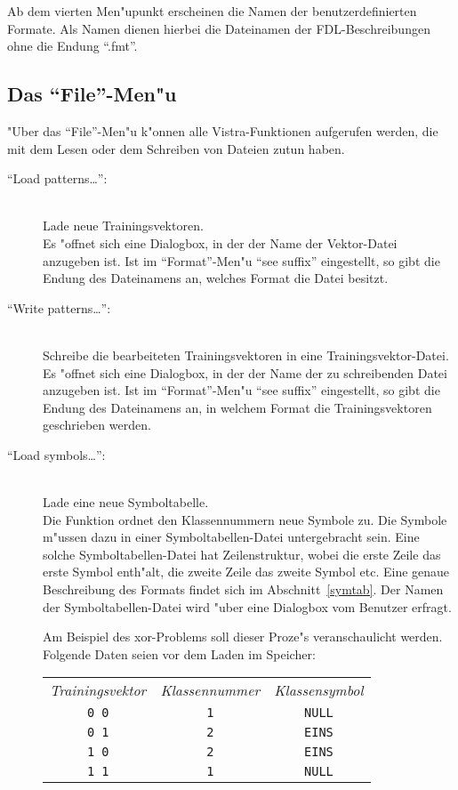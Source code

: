 Ab dem vierten Men"upunkt erscheinen die Namen der benutzerdefinierten
Formate.
Als Namen dienen hierbei die Dateinamen der FDL-Beschreibungen ohne
die Endung "`.fmt"'.  
 
\subsection{Das "`File"'-Men"u}

"Uber das "`File"'-Men"u k"onnen alle Vistra-Funktionen aufgerufen werden,
die mit dem Lesen oder dem Schreiben von Dateien zutun haben. 

\begin{description}
\item["`Load patterns\ldots"':] \mbox{} \\  
Lade neue Trainingsvektoren. \\
Es "offnet sich eine Dialogbox, in der der Name der Vektor-Datei
anzugeben ist.
Ist im "`Format"'-Men"u "`see suffix"' eingestellt, so gibt die Endung
des Dateinamens an, welches Format die Datei besitzt.

\item["`Write patterns\ldots"':] \mbox{} \\
Schreibe die bearbeiteten Trainingsvektoren in eine 
Trai\-nings\-vek\-tor-Datei. \\
Es "offnet sich eine Dialogbox, in der der Name der zu schreibenden Datei
anzugeben ist.
Ist im "`Format"'-Men"u "`see suffix"' eingestellt, so gibt die Endung
des Dateinamens an, in welchem Format die Trainingsvektoren geschrieben 
werden.

\item["`Load symbols\ldots"':] \mbox{} \\
Lade eine neue Symboltabelle. \\
Die Funktion ordnet den Klassennummern neue Symbole zu.
Die Symbole m"ussen dazu in einer Symboltabellen-Datei untergebracht sein.
Eine solche Symboltabellen-Datei hat Zeilenstruktur, wobei
die erste Zeile das erste Symbol enth"alt, die zweite Zeile das
zweite Symbol etc. 
Eine genaue Beschreibung des Formats findet sich im Abschnitt~\ref{symtab}.
Der Namen der Symboltabellen-Datei wird "uber eine Dialogbox vom Benutzer
erfragt.

Am Beispiel des xor-Problems soll dieser Proze"s veranschaulicht
werden. \\
Folgende Daten seien vor dem Laden im Speicher: 

\begin{tabular}{ccc}
{\sl Trainingsvektor} & {\sl Klassennummer} & {\sl Klassensymbol} \\[1ex]
{\tt 0 0} & {\tt 1} & {\tt NULL} \\
{\tt 0 1} & {\tt 2} & {\tt EINS} \\
{\tt 1 0} & {\tt 2} & {\tt EINS} \\
{\tt 1 1} & {\tt 1} & {\tt NULL} \\
\end{tabular}  


\end{description}
